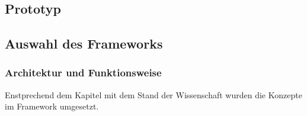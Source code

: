 \subsection{Prototyp}
\subsection{Auswahl des Frameworks}



\subsubsection{Architektur und Funktionsweise}
    Enstprechend dem Kapitel mit dem Stand der Wissenschaft wurden die Konzepte im Framework umgesetzt.
    